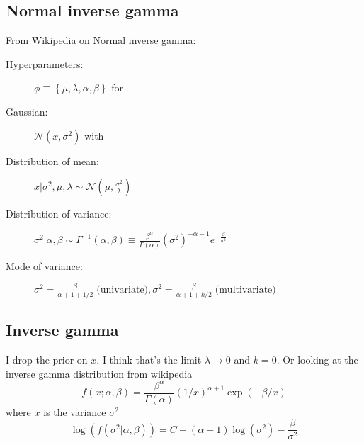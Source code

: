 \documentclass{article}
\newcommand{\Normal}{{\mathcal{N}}}
\begin{document}
\subsection*{Normal inverse gamma}

From Wikipedia on Normal inverse gamma:

\begin{description}
\item[Hyperparameters:] $\phi \equiv \left\{\mu, \lambda, \alpha, \beta
  \right\}$ for
\item[Gaussian:] $\Normal(x,\sigma^2)$ with
\item[Distribution of mean:] $x|\sigma^2, \mu, \lambda \sim
  \Normal\left(\mu, \frac{\sigma^2}{\lambda} \right)$
\item[Distribution of variance:] $\sigma^2 | \alpha, \beta \sim
  \Gamma^{-1}(\alpha, \beta) \equiv
  \frac{\beta^\alpha}{\Gamma(\alpha)} \left( \sigma^2
  \right)^{-\alpha - 1} e^{-\frac{\beta}{\sigma^2}}$
\item[Mode of variance:]
  $ \sigma ^{2}={\frac {\beta }{\alpha +1+1/2}}\;{\textrm
    {(univariate)}},\sigma ^{2}={\frac {\beta }{\alpha
      +1+k/2}}\;{\textrm {(multivariate)}}$
\end{description}

\subsection*{Inverse gamma}

I drop the prior on $x$.  I think that's the limit
$\lambda \rightarrow 0$ and $k=0$.  Or looking at the inverse gamma
distribution from wikipedia
\begin{equation*}
  f(x;\alpha ,\beta )={\frac {\beta ^{\alpha }}{\Gamma (\alpha )}}(1/x)^{\alpha +1}\exp \left(-\beta /x\right)
\end{equation*}
where $x$ is the variance $\sigma^2$
\begin{equation}
  \label{eq:LogPriorSigmaSquare}
  \log\left( f(\sigma^2|\alpha, \beta) \right) = C -
  (\alpha+1)\log(\sigma^2) - \frac{\beta}{\sigma^2}
\end{equation}
\end{document}
